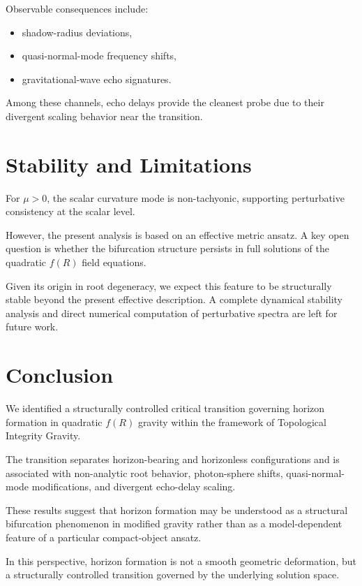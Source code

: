 \documentclass[11pt,a4paper]{article}
\begin{document}
Observable consequences include:
\begin{itemize}
\item shadow-radius deviations,
\item quasi-normal-mode frequency shifts,
\item gravitational-wave echo signatures.
\end{itemize}

Among these channels, echo delays provide the cleanest probe due to their divergent scaling behavior near the transition.

\section{Stability and Limitations}

For $\mu>0$, the scalar curvature mode is non-tachyonic, supporting perturbative consistency at the scalar level.

However, the present analysis is based on an effective metric ansatz. A key open question is whether the bifurcation structure persists in full solutions of the quadratic $f(R)$ field equations.

Given its origin in root degeneracy, we expect this feature to be structurally stable beyond the present effective description. A complete dynamical stability analysis and direct numerical computation of perturbative spectra are left for future work.

\section{Conclusion}

We identified a structurally controlled critical transition governing horizon formation in quadratic $f(R)$ gravity within the framework of Topological Integrity Gravity.

The transition separates horizon-bearing and horizonless configurations and is associated with non-analytic root behavior, photon-sphere shifts, quasi-normal-mode modifications, and divergent echo-delay scaling.

These results suggest that horizon formation may be understood as a structural bifurcation phenomenon in modified gravity rather than as a model-dependent feature of a particular compact-object ansatz.

In this perspective, horizon formation is not a smooth geometric deformation, but a structurally controlled transition governed by the underlying solution space.
\end{document}
